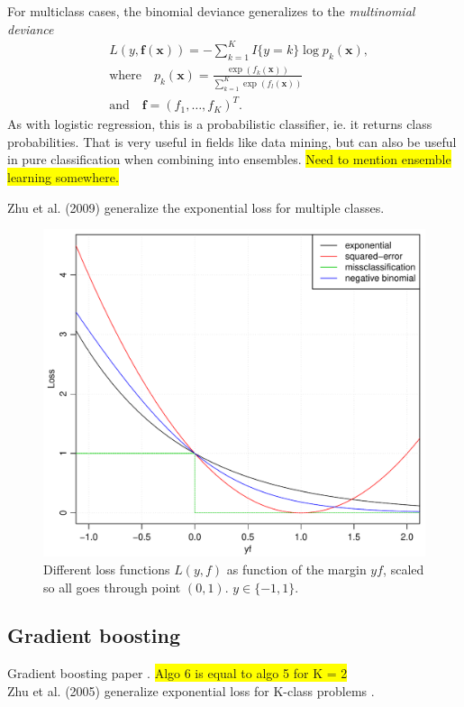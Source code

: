 For multiclass cases, the binomial deviance generalizes to the \textit{multinomial deviance}
\begin{align}
  \label{eq:multinomialDeviance} 
  &L(y, \mathbf{f}( \mathbf{x })) = - \sum^{K}_{k=1} I\{y = k\} \log p_k(\mathbf{x}), \\
  \label{eq:multinomialDevianceProb} 
  &\text{where} \quad p_k(\mathbf{x}) = \frac{\exp (f_k(\mathbf{x}))}{\sum^{K}_{k=1} \exp (f_l(\mathbf{x}))}\\
  &\text{and} \quad \mathbf{f} = (f_1, \ldots, f_K)^T.
\end{align}
As with logistic regression, this is a probabilistic classifier, ie. it returns class probabilities. That is very useful in fields like data mining, but can also be useful in pure classification when combining into ensembles. \colorbox{yellow}{Need to mention ensemble learning somewhere.}

Zhu et al. (2009) \cite{zhu2009} generalize the exponential loss for multiple classes.
%
\begin{figure}[h!]
\begin{center}
    \includegraphics[scale=0.5]{./figures/lossFunctions.pdf}
\end{center}
\caption{Different loss functions $L(y, f)$ as function of the margin $yf$, scaled so all goes through point $(0, 1)$. $y \in \{-1, 1\}$.}
\label{fig:lossFunctions}
\end{figure}
%
\subsection{Gradient boosting}
\label{sub:Gradient boosting}
Gradient boosting paper \cite{friedman}. \colorbox{yellow}{Algo 6 is equal to algo 5  for K = 2}\\
Zhu et al. (2005) generalize exponential loss for K-class problems \cite[p.~349]{modstat}.

